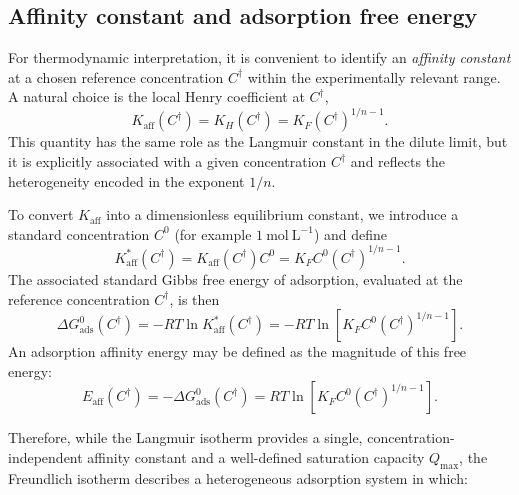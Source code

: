 	\subsection{Affinity constant and adsorption free energy}
	
	For thermodynamic interpretation, it is convenient to identify an
	\emph{affinity constant} at a chosen reference concentration
	\(C^{\dagger}\) within the experimentally relevant range. A
	natural choice is the local Henry coefficient at \(C^{\dagger}\),
	\begin{equation}
		K_{\mathrm{aff}}\!\left(C^{\dagger}\right)
		= K_H\!\left(C^{\dagger}\right)
		= K_F \left(C^{\dagger}\right)^{1/n - 1}.
	\end{equation}
	This quantity has the same role as the Langmuir constant in the
	dilute limit, but it is explicitly associated with a given
	concentration \(C^{\dagger}\) and reflects the heterogeneity
	encoded in the exponent \(1/n\).
	
	To convert \(K_{\mathrm{aff}}\) into a dimensionless equilibrium
	constant, we introduce a standard concentration \(C^0\) (for example
	\(1~\mathrm{mol~L^{-1}}\)) and define
	\begin{equation}
		K_{\mathrm{aff}}^{\ast}\!\left(C^{\dagger}\right)
		= K_{\mathrm{aff}}\!\left(C^{\dagger}\right) C^0
		= K_F C^0 \left(C^{\dagger}\right)^{1/n - 1}.
	\end{equation}
	The associated standard Gibbs free energy of adsorption, evaluated
	at the reference concentration \(C^{\dagger}\), is then
	\begin{equation}
		\Delta G_{\mathrm{ads}}^{0}\!\left(C^{\dagger}\right)
		= - R T
		\ln K_{\mathrm{aff}}^{\ast}\!\left(C^{\dagger}\right)
		= - R T
		\ln\!\left[
		K_F C^0 \left(C^{\dagger}\right)^{1/n - 1}
		\right].
	\end{equation}
	An adsorption affinity energy may be defined as the magnitude of
	this free energy:
	\begin{equation}
		E_{\mathrm{aff}}\!\left(C^{\dagger}\right)
		= - \Delta G_{\mathrm{ads}}^{0}\!\left(C^{\dagger}\right)
		= R T
		\ln\!\left[
		K_F C^0 \left(C^{\dagger}\right)^{1/n - 1}
		\right].
	\end{equation}
	
	Therefore, while the Langmuir isotherm provides a single,
	concentration-independent affinity constant and a well-defined
	saturation capacity \(Q_{\max}\), the Freundlich isotherm describes
	a heterogeneous adsorption system in which:
	

